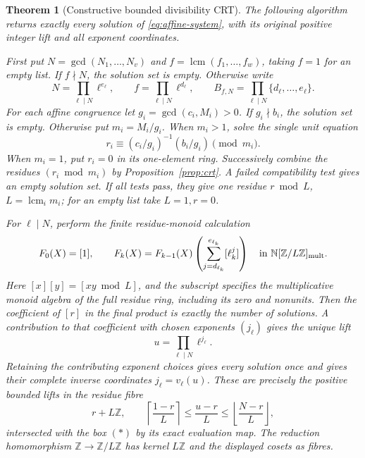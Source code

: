 \documentclass[11pt]{article}
\newtheorem{theorem}{Theorem}[section]
\theoremstyle{definition}\newtheorem{definition}[theorem]{Definition}
\theoremstyle{remark}\newtheorem{remark}[theorem]{Remark}
\DeclareMathOperator{\lcm}{lcm}
\newcommand{\Z}{\mathbb Z}\newcommand{\Q}{\mathbb Q}
\newcommand{\N}{\mathbb N}
\begin{document}
\begin{theorem}[Constructive bounded divisibility CRT]\label{thm:divisor-crt}
The following algorithm returns exactly every solution of
\eqref{eq:affine-system}, with its original positive integer
lift and all exponent coordinates.

First put \(N=\gcd(N_1,\ldots,N_v)\) and
\(f=\lcm(f_1,\ldots,f_w)\), taking \(f=1\) for an empty list.
If \(f\nmid N\), the solution set is empty.  Otherwise write
\[
 N=\prod_{\ell\mid N}\ell^{e_\ell},\qquad
 f=\prod_{\ell\mid N}\ell^{d_\ell},\qquad
 B_{f,N}=\prod_{\ell\mid N}\{d_\ell,\ldots,e_\ell\}.
 \tag{\(\ast\)}
\]
For each affine congruence let
\(g_i=\gcd(c_i,M_i)>0\).  If \(g_i\nmid b_i\), the solution
set is empty.  Otherwise put \(m_i=M_i/g_i\).
When \(m_i>1\), solve the single unit equation
\[
 r_i\equiv(c_i/g_i)^{-1}(b_i/g_i)\pmod{m_i}.
\]
When \(m_i=1\), put \(r_i=0\) in its one-element ring.
Successively combine the residues \((r_i\bmod m_i)\)
by Proposition~\ref{prop:crt}.  A failed compatibility test
gives an empty solution set.  If all tests pass, they give
one residue \(r\bmod L\), \(L=\lcm_i m_i\); for an empty
list take \(L=1,r=0\).

For \(\ell\mid N\), perform the finite residue-monoid
calculation
\begin{equation}\label{eq:monoid-dp}
 F_0(X)=[1],\qquad
 F_k(X)=F_{k-1}(X)
        \left(\sum_{j=d_{\ell_k}}^{e_{\ell_k}}[\ell_k^j]\right)
        \quad\text{in }\N[\Z/L\Z]_{\rm mult}.
\end{equation}
Here \([x][y]=[xy\bmod L]\), and the subscript specifies
the multiplicative monoid algebra of the full residue ring,
including its zero and nonunits.  Then the coefficient of
\([r]\) in the final product is exactly the number of
solutions.  A contribution to that coefficient with chosen
exponents \((j_\ell)\) gives the unique lift
\[
 u=\prod_{\ell\mid N}\ell^{j_\ell}.
\]
Retaining the contributing exponent choices gives every
solution once and gives their complete inverse coordinates
\(j_\ell=v_\ell(u)\).  These are precisely the positive
bounded lifts in the residue fibre
\begin{equation}\label{eq:numeric-fibre}
 r+L\Z,\qquad
 \left\lceil\frac{1-r}{L}\right\rceil
 \le\frac{u-r}{L}\le
 \left\lfloor\frac{N-r}{L}\right\rfloor,
\end{equation}
intersected with the box \((\ast)\) by its exact evaluation
map.  The reduction homomorphism \(\Z\to\Z/L\Z\) has kernel
\(L\Z\) and the displayed cosets as fibres.
\end{theorem}
\end{document}
